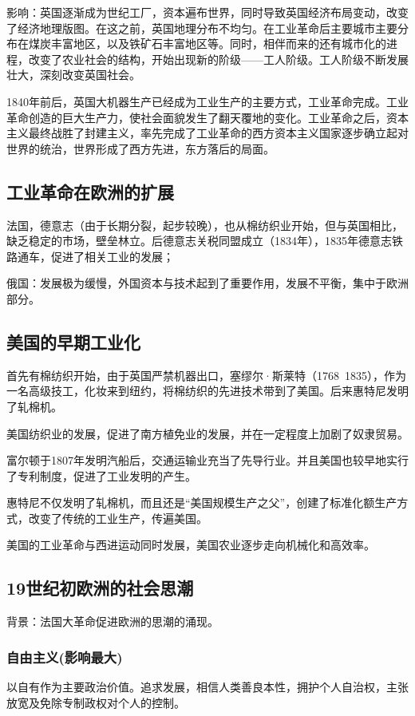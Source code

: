 影响：英国逐渐成为世纪工厂，资本遍布世界，同时导致英国经济布局变动，改变了经济地理版图。在这之前，英国地理分布不均匀。在工业革命后主要城市主要分布在煤炭丰富地区，以及铁矿石丰富地区等。同时，相伴而来的还有城市化的进程，改变了农业社会的结构，开始出现新的阶级——工人阶级。工人阶级不断发展壮大，深刻改变英国社会。

1840年前后，英国大机器生产已经成为工业生产的主要方式，工业革命完成。工业革命创造的巨大生产力，使社会面貌发生了翻天覆地的变化。工业革命之后，资本主义最终战胜了封建主义，率先完成了工业革命的西方资本主义国家逐步确立起对世界的统治，世界形成了西方先进，东方落后的局面。

\subsection{工业革命在欧洲的扩展}
法国，德意志（由于长期分裂，起步较晚），也从棉纺织业开始，但与英国相比，缺乏稳定的市场，壁垒林立。后德意志关税同盟成立（1834年），1835年德意志铁路通车，促进了相关工业的发展；

俄国：发展极为缓慢，外国资本与技术起到了重要作用，发展不平衡，集中于欧洲部分。

\subsection{美国的早期工业化}
首先有棉纺织开始，由于英国严禁机器出口，塞缪尔·斯莱特（1768~1835），作为一名高级技工，化妆来到纽约，将棉纺织的先进技术带到了美国。后来惠特尼发明了轧棉机。

美国纺织业的发展，促进了南方植免业的发展，并在一定程度上加剧了奴隶贸易。

富尔顿于1807年发明汽船后，交通运输业充当了先导行业。并且美国也较早地实行了专利制度，促进了工业发明的产生。

惠特尼不仅发明了轧棉机，而且还是“美国规模生产之父”，创建了标准化额生产方式，改变了传统的工业生产，传遍美国。

美国的工业革命与西进运动同时发展，美国农业逐步走向机械化和高效率。

\subsection{19世纪初欧洲的社会思潮}
背景：法国大革命促进欧洲的思潮的涌现。

\subsubsection{自由主义(影响最大)}
 以自有作为主要政治价值。追求发展，相信人类善良本性，拥护个人自治权，主张放宽及免除专制政权对个人的控制。

